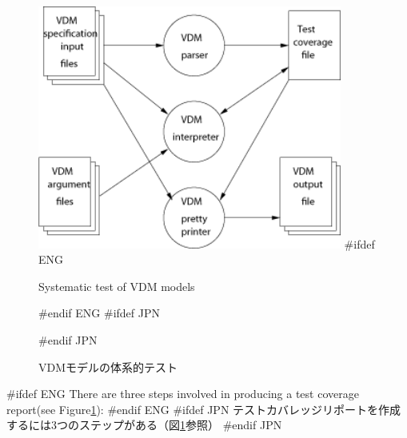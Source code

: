 \documentclass[\pformat,12pt]{article}
\begin{document}
\begin{figure}[tbh]
\begin{center}
\includegraphics[width=10cm]{testenv.png}
#ifdef ENG
\caption{Systematic test of VDM models}
#endif ENG
#ifdef JPN
\caption{VDMモデルの体系的テスト}
#endif JPN
\label{fig:testenv}
\end{center}
\end{figure}

#ifdef ENG
There are three steps involved in producing a test coverage
report(see Figure\ref{fig:testenv}):
#endif ENG
#ifdef JPN
テストカバレッジリポートを作成するには3つのステップがある（図\ref{fig:testenv}参照）
#endif JPN
\end{document}
